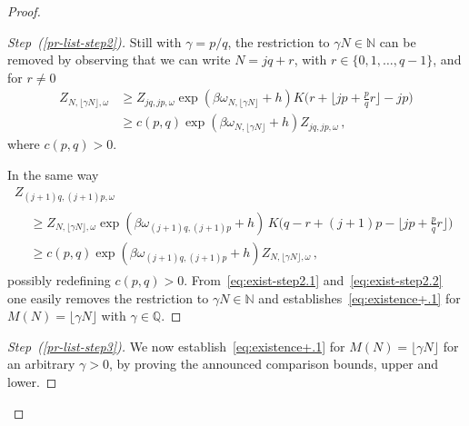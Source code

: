 \documentclass[AHL,Unicode,longabstracts]{cedram}
\newenvironment{step}[1]{\begin{proof}[#1]}{\let\qed\relax\end{proof}}
\newcommand{\gb}{\beta}
\newcommand{\go}{\omega}
\newcommand{\bbN}{\ensuremath{\mathbb{N}}}
\newcommand{\bbQ}{\ensuremath{\mathbb{Q}}}
\begin{document}
\begin{proof}
\begin{step}{Step~(\ref{pr-list-step2})}
Still with $\gamma =p/q$, the restriction to $\gamma N \in \bbN$ can be removed by observing that we can write $N= jq+r$, with $r\in \{0, 1, \ldots, q-1\}$, and for $r\neq 0$
\begin{equation}\label{eq:exist-step2.1}
\begin{split}
Z_{N, \lfloor \gamma N \rfloor, \go} &\ge Z_{jq, jp, \go} \exp(\gb \go_{N, \lfloor \gamma N \rfloor}+h) K \Big(r+ \Big \lfloor jp+ \frac{p}{q} r \Big \rfloor -jp \Big)
\\ & \ge c(p,q) \exp(\gb \go_{N, \lfloor \gamma N \rfloor}+h) Z_{jq, jp, \go}\,,
\end{split}
\end{equation}
where $c(p,q)>0$.

In the same way
\begin{multline}\label{eq:exist-step2.2}
Z_{(j+1)q, (j+1)p, \go}\\
\begin{aligned}
&\ge Z_{N, \lfloor \gamma N \rfloor, \go} \exp(\gb \go_{(j+1)q, (j+1)p}+h)\,K \Big(q-r+ (j+1)p- \Big \lfloor jp+ \frac{p}{q} r \Big \rfloor\!\Big)\\
&\ge c(p,q) \exp(\gb \go_{(j+1)q, (j+1)p}+h) Z_{N, \lfloor \gamma N \rfloor, \go}\,,
\end{aligned}
\end{multline}
possibly redefining $c(p,q)>0$. From~\eqref{eq:exist-step2.1} and~\eqref{eq:exist-step2.2} one easily removes the restriction to $\gamma N \in \bbN$ and establishes~\eqref{eq:existence+.1} for $M(N) = \lfloor \gamma N \rfloor$ with $\gamma\in \bbQ$.
\end{step}

\begin{step}{Step~(\ref{pr-list-step3})}
We now establish~\eqref{eq:existence+.1} for $M(N)= \lfloor \gamma N\rfloor$ for an arbitrary $\gamma>0$, by proving the announced comparison bounds, upper and lower.


\end{step}
\end{proof}
\end{document}

